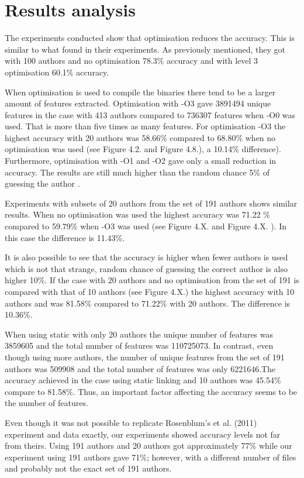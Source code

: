 \documentclass[a4paper,11pt]{kth-mag}
\begin{document}
\section{Results analysis}
The experiments conducted show that optimisation reduces the accuracy. This is
similar to what \parencite{caliskan2015coding} found in their experiments. As
previously mentioned, they got with 100 authors and no optimisation 78.3\%
accuracy and with level 3 optimisation 60.1\% accuracy.

When optimisation is used to compile the binaries there tend to be a larger
amount of features extracted. Optimisation with -O3 gave 3891494 unique
features in the case with 413 authors compared to 736307 features when -O0 was
used. That is more than five times as many features. For optimisation -O3  the
highest accuracy with 20 authors was 58.66\% compared to 68.80\% when no
optimisation was used (see Figure 4.2. and Figure 4.8.), a 10.14\% difference).
Furthermore, optimisation with -O1 and -O2 gave only a small reduction in
accuracy. The results are still much higher than the random chance 5\% of
guessing the author . 

Experiments with subsets of 20 authors from the set of 191 authors shows
similar results. When no optimisation was used the highest accuracy was 71.22
\% compared to 59.79\% when -O3 was used (see Figure 4.X. and  Figure 4.X. ).
In this case the difference is 11.43\%.

It is also possible to see that the accuracy is higher when fewer authors is
used which is not that strange, random chance of guessing the correct author is
also higher 10\%. If the case with 20 authors and no optimisation from the set
of 191 is compared with that of 10 authors (see Figure 4.X.) the highest
accuracy with 10 authors and was 81.58\% compared to 71.22\% with 20 authors.
The difference is 10.36\%.

When using static with only 20 authors the unique number of features was
3859605 and the total number of features was 110725073. In contrast, even
though using more authors,  the number of unique features from the set of 191
authors was 509908 and the total number of features was only 6221646.The
accuracy achieved in the case using static linking and 10 authors was 45.54\%
compare to 81.58\%. Thus, an important factor affecting the accuracy seems to
be the number of features. 

Even though it was not possible to replicate Rosenblum’s et al. (2011) experiment and data
exactly, our experiments showed accuracy levels not far from theirs. Using 191
authors and 20 authors \parencite{rosenblum2011wrote} got approximately 77\% while
our experiment using 191 authors gave 71\%; however, with a different number of files and
probably not the exact set of 191 authors.     
\end{document}
